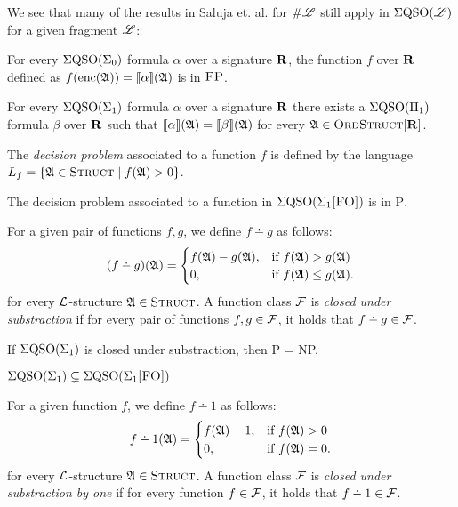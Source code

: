 We see that many of the results in Saluja et. al. \cite{DBLP:journals/jcss/SalujaST95} for $\#\mathscr{L}$ still apply in $\Sigma{\rm QSO}(\mathscr{L})$ for a given fragment $\mathscr{L}$:

\begin{theorem} \label{eqso-sigma-zero-in-fp}
	For every $\Sigma{\rm QSO}(\Sigma_{0})$ formula $\alpha$ over a signature $\mathbf{R}$, the function $f$ over $\mathbf{R}$ defined as $f({\rm enc}(\mathfrak{A})) = {\llbracket{}{\alpha}\rrbracket}(\mathfrak{A})$ is in $\text{\sc FP}$.
\end{theorem}

\begin{theorem} \label{eqso-sigma-one-in-eqso-pi-one}
	For every $\Sigma{\rm QSO}(\Sigma_{1})$ formula $\alpha$ over a signature $\mathbf{R}$ there exists a $\Sigma{\rm QSO}(\Pi_{1})$ formula $\beta$ over $\mathbf{R}$ such that ${\llbracket{}{\alpha}\rrbracket}(\mathfrak{A}) = {\llbracket{}{\beta}\rrbracket}(\mathfrak{A})$ for every $\mathfrak{A}\in\text{\sc OrdStruct}[\mathbf{R}]$.
\end{theorem}


The {\em decision problem} associated to a function $f$ is defined by the language $L_f = \{\mathfrak{A} \in \text{\sc Struct} \mid f(\mathfrak{A}) > 0\}$.

\begin{theorem} \label{decisionptime}
	The decision problem associated to a function in $\Sigma{\rm QSO}(\Sigma_{1}\textsc{[FO]})$ is in \textsc{P}.
\end{theorem}

For a given pair of functions $f,g$, we define $f \dotminus g$ as follows:
\begin{eqnarray*}
	(f \dotminus g)(\A) =
	\begin{cases}
		f(\A)-g(\A), & \text{if }f(\A)>g(\A) \\
		0, & \text{if }f(\A) \leq g(\A).
	\end{cases}
\end{eqnarray*}
for every $\L$-structure $\mathfrak{A} \in \text{\sc Struct}$. A function class $\F$ is {\em closed under substraction} if for every pair of functions $f,g \in \F$, it holds that $f \dotminus g \in \F$.

\begin{theorem} \label{sub-pnp}
	If $\Sigma{\rm QSO}(\Sigma_{1})$ is closed under substraction, then {\sc P} = {\sc NP}.
\end{theorem}

\begin{theorem} \label{sigma1strict}
	$\Sigma{\rm QSO}(\Sigma_{1}) \subsetneq \Sigma{\rm QSO}(\Sigma_{1}\textsc{[FO]})$
\end{theorem}

For a given function $f$, we define $f \dotminus 1$ as follows:
\begin{eqnarray*}
	f \dotminus 1(\A) =
	\begin{cases}
		f(\A)-1, & \text{if }f(\A) > 0 \\
		0, & \text{if }f(\A) = 0.
	\end{cases}
\end{eqnarray*}
for every $\L$-structure $\mathfrak{A} \in \text{\sc Struct}$. A function class $\F$ is {\em closed under substraction by one} if for every function $f \in \F$, it holds that $f \dotminus 1 \in \F$.

